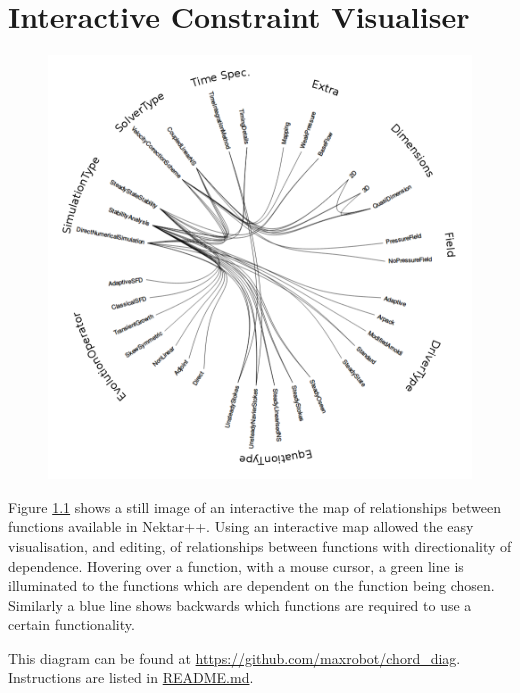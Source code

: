\documentclass[11pt, a4paper]{report}
\begin{document}
\chapter{Interactive Constraint Visualiser}
\label{app:constraints}

\begin{figure}[htb!]
 \centering
 \includegraphics[width=.9\linewidth,  clip=true, trim = 0cm 0cm 0cm 0cm]{constraint_mapping}
 \label{fig:constraint_mapping}
\end{figure}

Figure \ref{fig:constraint_mapping} shows a still image of an interactive the map of relationships between functions available in Nektar++. Using an interactive map allowed the easy visualisation, and editing, of relationships between functions with directionality of dependence. Hovering over a function, with a mouse cursor, a green line is illuminated to the functions which are dependent on the function being chosen. Similarly a blue line shows backwards which functions are required to use a certain functionality.

This diagram can be found at \url{https://github.com/maxrobot/chord_diag}. Instructions are listed in \url{README.md}.
\end{document}
